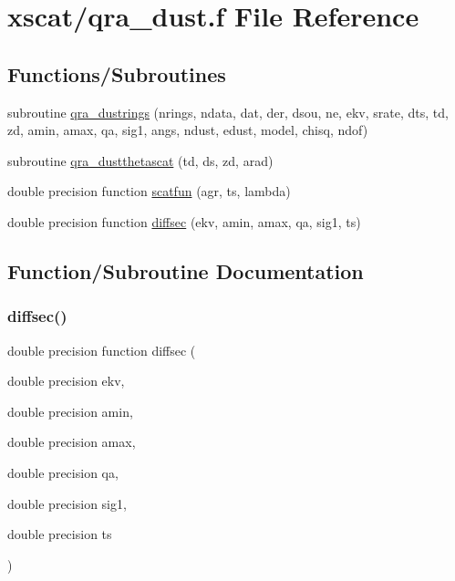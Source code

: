 \hypertarget{qra__dust_8f}{}\section{xscat/qra\+\_\+dust.f File Reference}
\label{qra__dust_8f}
\subsection*{Functions/\+Subroutines}
\begin{DoxyCompactItemize}
\item 
subroutine \hyperlink{qra__dust_8f_a46f9c812bf42c0fea75fa91455f98652}{qra\+\_\+dustrings} (nrings, ndata, dat, der, dsou, ne, ekv, srate, dts, td, zd, amin, amax, qa, sig1, angs, ndust, edust, model, chisq, ndof)
\item 
subroutine \hyperlink{qra__dust_8f_a40ca5b41eb59b4d866ae8402d69cc74f}{qra\+\_\+dustthetascat} (td, ds, zd, arad)
\item 
double precision function \hyperlink{qra__dust_8f_a993fd66229d12e6af7bf7aa8873f4eb5}{scatfun} (agr, ts, lambda)
\item 
double precision function \hyperlink{qra__dust_8f_a0fb359a57c070bdf38d7cd2e817cd1fc}{diffsec} (ekv, amin, amax, qa, sig1, ts)
\end{DoxyCompactItemize}


\subsection{Function/\+Subroutine Documentation}
\mbox{\label{qra__dust_8f_a0fb359a57c070bdf38d7cd2e817cd1fc}} 
\subsubsection{\texorpdfstring{diffsec()}{diffsec()}}
{\footnotesize\ttfamily double precision function diffsec (\begin{DoxyParamCaption}\item[{double precision}]{ekv,  }\item[{double precision}]{amin,  }\item[{double precision}]{amax,  }\item[{double precision}]{qa,  }\item[{double precision}]{sig1,  }\item[{double precision}]{ts }\end{DoxyParamCaption})}


